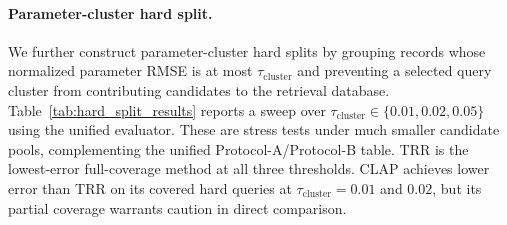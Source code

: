\begin{table}[t]
\centering
\caption{Near-duplicate sensitivity under the unified Protocol-A evaluator. Threshold 0.000 is the no-filter canonical row and matches Table~\ref{tab:main_results}; thresholds $>0$ remove candidates within that normalized parameter RMSE of any query. Lower Norm.L2 is better.}
\label{tab:near_dup_sensitivity}
\small
\setlength{\tabcolsep}{4pt}
\end{table}

\paragraph{Parameter-cluster hard split.}
We further construct parameter-cluster hard splits by grouping records whose normalized parameter RMSE is at most $\tau_{\mathrm{cluster}}$ and preventing a selected query cluster from contributing candidates to the retrieval database. Table~\ref{tab:hard_split_results} reports a sweep over $\tau_{\mathrm{cluster}}\in\{0.01,0.02,0.05\}$ using the unified evaluator. These are stress tests under much smaller candidate pools, complementing the unified Protocol-A/Protocol-B table. TRR is the lowest-error full-coverage method at all three thresholds. CLAP achieves lower error than TRR on its covered hard queries at $\tau_{\mathrm{cluster}}=0.01$ and $0.02$, but its partial coverage warrants caution in direct comparison.

